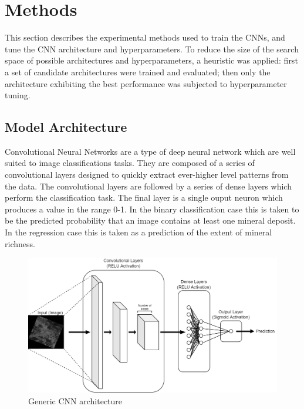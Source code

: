\documentclass[10pt]{article}
\begin{document}
\section{Methods}


This section describes the experimental methods used to train the CNNs,
and tune the CNN architecture and hyperparameters. To reduce the size of 
the search space of possible architectures and hyperparameters, a heuristic
was applied: first a set of candidate architectures were trained and evaluated;
then only the architecture exhibiting the best performance was subjected to
hyperparameter tuning.

\subsection{Model Architecture}




Convolutional Neural Networks are a type of deep neural network which are 
well suited to image classifications tasks. They are composed of a series
of convolutional layers designed to quickly extract ever-higher level patterns
from the data. The convolutional layers are followed by a series of dense
layers which perform the classification task. The final layer is a single ouput
neuron which produces a value in the range 0-1. In the binary classification case
this is taken to be the predicted probability that an image contains at least one
mineral deposit. In the regression case this is taken as a prediction of the extent
of mineral richness.

\begin{figure}[ht]
  \centering
  \includegraphics[width=0.75\linewidth]{cnn.png}
  \caption{Generic CNN architecture}
  \label{fig:cnn}
\end{figure}
\end{document}
